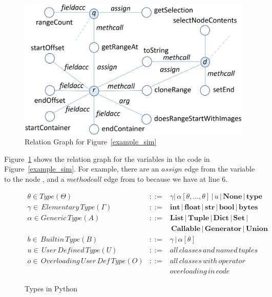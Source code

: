 \begin{figure}[t]
	\begin{center}
	  \includegraphics[width=0.9\columnwidth]{figures/relation-graph}
          \vspace{-6pt}
		\caption{Relation Graph for Figure~\ref{example_sim}}
		\label{rel-graph}
	\end{center}
\end{figure}

Figure~\ref{rel-graph} shows the relation graph for the variables in
the code in Figure~\ref{example_sim}. For example, there are an
$assign$ edge from the variable  to the node
, and a $methodcall$ edge from  to
 because we have  at line
6.




\begin{figure}[t]
  \small
  \begin{eqnarray*}
    \theta \in Type (\Theta) &::=& \gamma | \, \alpha [\theta, ..., \theta] \, | \, u \, | \, \mathbf{None} \, | \, \mathbf{type}\\
  \gamma \in \, Elementary \, Type (\Gamma) &::=& \mathbf{int} \, | \, \mathbf{float} \, | \, \mathbf{str} \, | \, \mathbf{bool} \, | \, \mathbf{bytes}\\
  \alpha \in Generic \, Type (A) &::=& \mathbf{List} \, | \, \mathbf{Tuple} \, | \, \mathbf{Dict} \, | \, \mathbf{Set} \, |\\
  & & \, \mathbf{Callable} \, | \, \mathbf{Generator} \, | \, \mathbf{Union}\\
  b \in \, Builtin \, Type (B) &::=& \gamma \, | \, \alpha[\theta]\\
  u \in \, User \, Defined \, Type (U) &::=& all \, classes \, and \, named \, tuples\\
  o \in \, Overloading \, User \, Def \, Type (O) &::=& all \, classes \, with \, operator \\
  & & overloading \, in \, code
  \end{eqnarray*}
  \vspace{-18pt}
\caption{Types in Python}
\label{python-types}
\end{figure}

